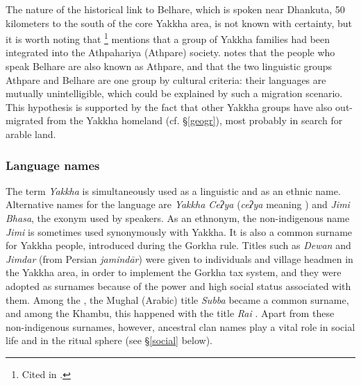 The nature of the historical link to Belhare, which is spoken near Dhankuta, 50 kilometers to the  south of the core Yakkha area, is not known with certainty, but it is worth noting that \citet[13,47]{Dahal1985An-ethnographic}\footnote{Cited in \citet[1]{Russell1992_Yakha}.} mentions that a group of Yakkha families had been integrated into the Athpahariya (Athpare) society. \citet[21]{Bickel1996Aspect} notes that the people who speak Belhare are also known as Athpare, and that the two linguistic groups Athpare and Belhare are one group  by cultural criteria: their languages are mutually unintelligible, which could be explained by such a migration scenario. This hypothesis is supported by the fact that other Yakkha groups have also out-migrated from the Yakkha homeland (cf. §\ref{geogr}), most probably in search for arable land.


\subsubsection{Language names}

The term \emph{Yakkha} is simultaneously used as a linguistic and as an ethnic name. Alternative names for the language are \emph{Yakkha Ceʔya} (\emph{ceʔya} meaning ) and \emph{Jimi Bhasa}, the exonym used by  speakers.  As an ethnonym, the non-indigenous name \emph{Jimi}  is  sometimes used synonymously with Yakkha. It is also a common surname for Yakkha people, introduced during the Gorkha rule. Titles such as \emph{Dewan} and \emph{Jimdar} (from Persian \emph{jamindār}) were given to individuals  and village headmen in the Yakkha area, in order to implement the Gorkha tax system, and they were adopted as surnames because of the power and high social status associated with them. Among the , the Mughal (Arabic) title \emph{Subba} became a common surname, and among the Khambu, this happened with the title \emph{Rai}  \citep[51]{Whelpton2005A-History}. Apart from these non-indigenous surnames, however, ancestral clan names play a vital role in social life and in the ritual sphere (see §\ref{social} below).  

